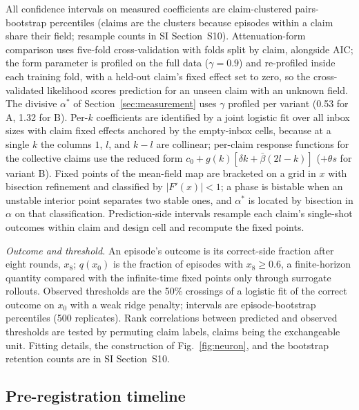 \documentclass[9pt,twocolumn]{extarticle}
\newcommand{\astar}{\alpha^{*}}
\begin{document}
All confidence intervals on measured coefficients are claim-clustered
pairs-bootstrap percentiles (claims are the clusters because episodes within
a claim share their field; resample counts in SI Section~S10).
Attenuation-form comparison uses five-fold cross-validation with folds split
by claim, alongside AIC; the form parameter is profiled on the full data
($\gamma = 0.9$) and re-profiled inside each training fold, with a held-out
claim's fixed effect set to zero, so the cross-validated likelihood scores
prediction for an unseen claim with an unknown field. The divisive $\astar$
of Section~\ref{sec:measurement} uses $\gamma$ profiled per variant (0.53 for
A, 1.32 for B). Per-$k$ coefficients are identified by a joint logistic fit
over all inbox sizes with claim fixed effects anchored by the empty-inbox
cells, because at a single $k$ the columns $1$, $l$, and $k - l$ are
collinear; per-claim response functions for the collective claims use the
reduced form $c_0 + g(k)[\delta k + \bar\beta(2l - k)]$ ($+\theta s$ for
variant B). Fixed points of the mean-field map are bracketed on a grid in $x$
with bisection refinement and classified by $|F'(x)| < 1$; a phase is
bistable when an unstable interior point separates two stable ones, and
$\astar$ is located by bisection in $\alpha$ on that classification.
Prediction-side intervals resample each claim's single-shot outcomes within
claim and design cell and recompute the fixed points.

\emph{Outcome and threshold.} An episode's outcome is its correct-side
fraction after eight rounds, $x_8$; $q(x_0)$ is the fraction of episodes with
$x_8 \ge 0.6$, a finite-horizon quantity compared with the infinite-time
fixed points only through surrogate rollouts. Observed thresholds are the
50\% crossings of a logistic fit of the correct outcome on $x_0$ with a weak
ridge penalty; intervals are episode-bootstrap percentiles (500 replicates).
Rank correlations between predicted and observed thresholds are tested by
permuting claim labels, claims being the exchangeable unit. Fitting details,
the construction of Fig.~\ref{fig:neuron}, and the bootstrap retention
counts are in SI Section~S10.

\subsection*{Pre-registration timeline}
\end{document}
